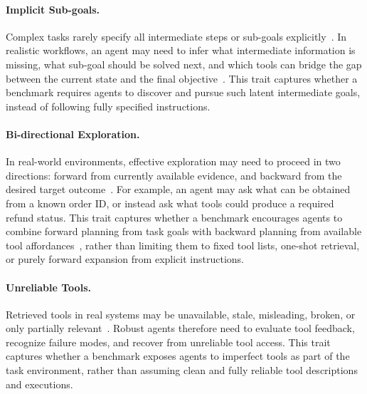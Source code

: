 \paragraph{Implicit Sub-goals.}
Complex tasks rarely specify all intermediate steps or sub-goals explicitly~\citep{EscapeBench}. 
In realistic workflows, an agent may need to infer what intermediate information is missing, what sub-goal should be solved next, and which tools can bridge the gap between the current state and the final objective~\citep{PlanAndSolve}. 
This trait captures whether a benchmark requires agents to discover and pursue such latent intermediate goals, instead of following fully specified instructions.

\paragraph{Bi-directional Exploration.}
In real-world environments, effective exploration may need to proceed in two directions: forward from currently available evidence, and backward from the desired target outcome~\citep{BackwardPlanningLLM}. 
For example, an agent may ask what can be obtained from a known order ID, or instead ask what tools could produce a required refund status. 
This trait captures whether a benchmark encourages agents to combine forward planning from task goals with backward planning from available tool affordances~\citep{CreativityBench}, rather than limiting them to fixed tool lists, one-shot retrieval, or purely forward expansion from explicit instructions.

\paragraph{Unreliable Tools.}
Retrieved tools in real systems may be unavailable, stale, misleading, broken, or only partially relevant~\citep{CostBench, UserBench}. 
Robust agents therefore need to evaluate tool feedback, recognize failure modes, and recover from unreliable tool access. 
This trait captures whether a benchmark exposes agents to imperfect tools as part of the task environment, rather than assuming clean and fully reliable tool descriptions and executions.

